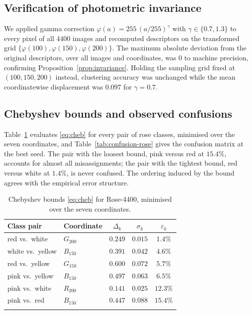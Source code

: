 \documentclass[pdflatex,sn-basic]{sn-jnl}
\theoremstyle{thmstyleone}%
\theoremstyle{thmstyletwo}%
\theoremstyle{thmstylethree}%
\begin{document}
\subsection{Verification of photometric invariance}\label{sec:invariance-exp}

We applied gamma correction $\varphi(a)=255\,(a/255)^{\gamma}$ with
$\gamma\in\{0.7,1.3\}$ to every pixel of all 4400 images and recomputed
descriptors on the transformed grid $\{\varphi(100),\varphi(150),
\varphi(200)\}$. The maximum absolute deviation from the original descriptors,
over all images and coordinates, was $0$ to machine precision, confirming
Proposition~\ref{prop:invariance}. Holding the sampling grid fixed at
$(100,150,200)$ instead, clustering accuracy was unchanged while the mean
coordinatewise displacement was $0.097$ for $\gamma=0.7$.

\subsection{Chebyshev bounds and observed confusions}\label{sec:bounds-exp}

Table~\ref{tab:cheb-bounds} evaluates \eqref{eq:cheb} for every pair of rose
classes, minimised over the seven coordinates, and
Table~\ref{tab:confusion-rose} gives the confusion matrix at the best seed. The
pair with the loosest bound, pink versus red at $15.4\%$, accounts for almost
all misassignments; the pair with the tightest bound, red versus white at
$1.4\%$, is never confused. The ordering induced by the bound agrees with the
empirical error structure.

\begin{table}[h]
\centering
\caption{Chebyshev bounds \eqref{eq:cheb} for Rose-4400, minimised over the
seven coordinates.}\label{tab:cheb-bounds}
\begin{tabular}{@{}llccc@{}}
\toprule
Class pair & Coordinate & $\Delta_k$ & $\sigma_k$ & $\varepsilon_k$ \\
\midrule
red vs.\ white    & $G_{200}$ & $0.249$ & $0.015$ & $1.4\%$ \\
white vs.\ yellow & $B_{150}$ & $0.391$ & $0.042$ & $4.6\%$ \\
red vs.\ yellow   & $G_{150}$ & $0.600$ & $0.072$ & $5.7\%$ \\
pink vs.\ yellow  & $B_{150}$ & $0.497$ & $0.063$ & $6.5\%$ \\
pink vs.\ white   & $R_{200}$ & $0.141$ & $0.025$ & $12.3\%$ \\
pink vs.\ red     & $B_{150}$ & $0.447$ & $0.088$ & $15.4\%$ \\
\botrule
\end{tabular}
\end{table}
\end{document}
